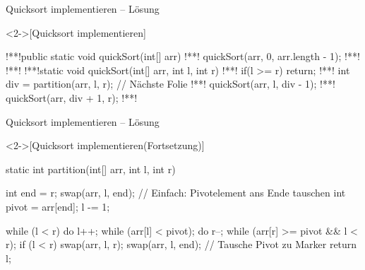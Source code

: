 \begin{frame}[fragile,c]{Quicksort implementieren -- Lösung}
    \begin{solve}<2->[Quicksort implementieren]
\begin{plainjava}
!**!public static void quickSort(int[] arr) {
!**!    quickSort(arr, 0, arr.length - 1);
!**!}
!**!
!**!static void quickSort(int[] arr, int l, int r) {
!**!    if(l >= r) return;
!**!    int div = partition(arr, l, r); // Nächste Folie
!**!    quickSort(arr, l, div - 1);
!**!    quickSort(arr, div + 1, r);
!**!}
    \end{plainjava}
    \end{solve}
\end{frame}

\begin{frame}[fragile,c]{Quicksort implementieren -- Lösung}
    \addtocounter{solve}{-1}%
    \begin{solve}<2->[Quicksort implementieren\hfill(Fortsetzung)]
\begin{plainjava}
static int partition(int[] arr, int l, int r) {
    int end = r;
    swap(arr, l, end); // Einfach: Pivotelement ans Ende tauschen
    int pivot = arr[end];
    l -= 1;

    while (l < r) {
        do { l++; } while (arr[l] < pivot);
        do { r--; } while (arr[r] >= pivot && l < r);
        if (l < r) swap(arr, l, r);
    }
    swap(arr, l, end); // Tausche Pivot zu Marker
    return l;
}
    \end{plainjava}
    \end{solve}
\end{frame}
\fi

